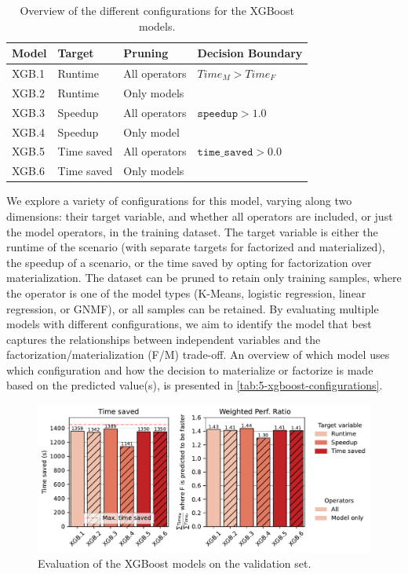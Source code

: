 \begin{table}[ht]
  \centering
  \begin{tabular}{llll}
    \toprule
    Model & Target     & Pruning       & Decision Boundary            \\
    \midrule \midrule
    XGB.1 & Runtime    & All operators & $Time_M > Time_F$            \\
    XGB.2 & Runtime    & Only models   &                              \\
    XGB.3 & Speedup    & All operators & $\texttt{speedup} > 1.0$     \\
    XGB.4 & Speedup    & Only model    &                              \\
    XGB.5 & Time saved & All operators & $\texttt{time\_saved} > 0.0$ \\
    XGB.6 & Time saved & Only models   &                              \\
    \bottomrule
  \end{tabular}
  \caption[XGBoost configurations]{Overview of the different configurations for the XGBoost models.}
  \label{tab:5-xgboost-configurations}
\end{table}

We explore a variety of configurations for this model, varying along two dimensions: their target variable, and whether all operators are included, or just the model operators, in the training dataset. The target variable is either the runtime of the scenario (with separate targets for factorized and materialized), the speedup of a scenario, or the time saved by opting for factorization over materialization. The dataset can be pruned to retain only training samples, where the operator is one of the model types (K-Means, logistic regression, linear regression, or GNMF), or all samples can be retained. By evaluating multiple models with different configurations, we aim to identify the model that best captures the relationships between independent variables and the factorization/materialization (F/M) trade-off. An overview of which model uses which configuration and how the decision to materialize or factorize is made based on the predicted value(s), is presented in \autoref{tab:5-xgboost-configurations}.

\begin{figure}[ht]
  \centering
  \includegraphics[width=\linewidth]{chapters/05_cost_estimation/figures/xgb-models-compare.pdf}
  \caption[XGBoost model Comparison]{Evaluation of the XGBoost models on the validation set.}
  \label{fig:5-xgboost-evaluation}
\end{figure}

